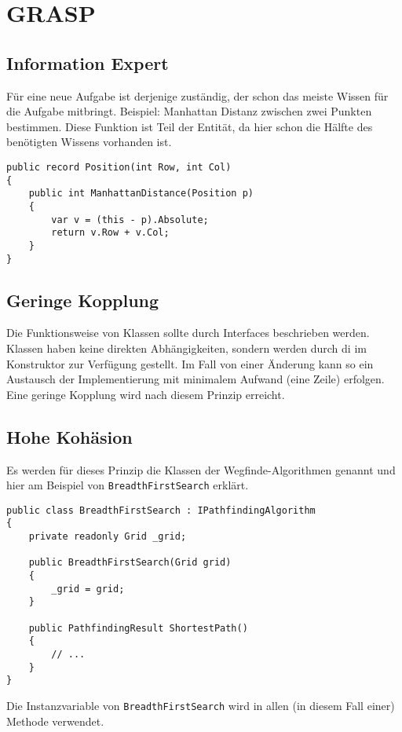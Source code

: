 \section{GRASP}
\subsection{Information Expert} \label{sec:info-expert}
Für eine neue Aufgabe ist derjenige zuständig, der schon das meiste Wissen für die Aufgabe
mitbringt. Beispiel: Manhattan Distanz zwischen zwei Punkten bestimmen.
Diese Funktion ist Teil der \ePosition{} Entität,
da hier schon die Hälfte des benötigten Wissens vorhanden ist.
\begin{lstlisting}[caption={Manhattan Distanz}]
public record Position(int Row, int Col)
{
    public int ManhattanDistance(Position p)
    {
        var v = (this - p).Absolute;
        return v.Row + v.Col;
    }
}
\end{lstlisting}

\subsection{Geringe Kopplung}
Die Funktionsweise von Klassen sollte durch Interfaces beschrieben werden.
Klassen haben keine direkten Abhängigkeiten, sondern werden durch \ac{di}
im Konstruktor zur Verfügung gestellt.
Im Fall von einer Änderung kann so ein Austausch der
Implementierung mit minimalem Aufwand (eine Zeile) erfolgen.
Eine geringe Kopplung wird nach diesem Prinzip erreicht.

\subsection{Hohe Kohäsion}
Es werden für dieses Prinzip die Klassen der Wegfinde-Algorithmen genannt
und hier am Beispiel von \lstinline{BreadthFirstSearch} erklärt.
\newpage
\begin{lstlisting}[caption={\lstinline{BreadthFirstSearch} Algorithmus}]
public class BreadthFirstSearch : IPathfindingAlgorithm
{
    private readonly Grid _grid;

    public BreadthFirstSearch(Grid grid)
    {
        _grid = grid;
    }

    public PathfindingResult ShortestPath()
    {
        // ...
    }
}
\end{lstlisting}
Die Instanzvariable von \lstinline{BreadthFirstSearch}
wird in allen (in diesem Fall einer) Methode verwendet.